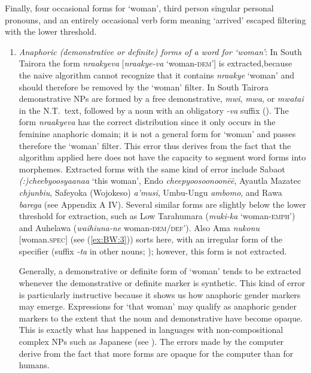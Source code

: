 \documentclass[output=collectionpaper]{langsci/langscibook}
\begin{document}
Finally, four occasional forms for ‘woman’, third person singular personal pronouns, and an entirely occasional verb form meaning ‘arrived’ escaped filtering with the lower threshold.

\begin{enumerate}[label=(\alph*)]
\item
\emph{Anaphoric (demonstrative or definite) forms of a word for ‘woman’}: In South Tairora the form \textit{nraakyeva} [\textit{nraakye-va} ‘woman-\textsc{dem}’] is extracted,\linebreak because the naive algorithm cannot recognize that it contains \textit{nraakye} ‘woman’ and should therefore be removed by the ‘woman’ filter. In South Tairora demonstrative NPs are formed by a free demonstrative, \textit{mwi}, \textit{mwa}, or \textit{mwatai} in the N.T.\ text, followed by a noun with an obligatory \textit{-va} suffix (\citealt[584]{Vincent2010}). The form \textit{nraakyeva} has the correct distribution since it only occurs in the feminine anaphoric domain; it is not a general form for ‘woman’ and passes therefore the ‘woman’ filter. This error thus derives from the fact that the algorithm applied here does not have the capacity to segment word forms into morphemes. Extracted forms with the same kind of error include Sabaot \textit{(:)cheebyoosyaanaa} ‘this woman’, Endo \textit{cheepyoosoonoonēē}, Ayautla Mazatec \textit{chjunbiu}, Safeyoka (Wojokeso) \textit{a'musi}, Umbu-Ungu \textit{ambomo}, and Rawa \textit{barega}
(see Appendix A IV). Several similar forms are slightly below the lower threshold for extraction, such as Low Tarahumara (\textit{muki-ka} ‘woman-\textsc{emph}') and Auhelawa (\textit{waihiuna-ne} woman-\textsc{dem/def}’). Also Ama \textit{nukonu} [woman.\textsc{spec}] (see (\ref{ex:BW:3})) sorts here, with an irregular form of the specifier (suffix \textit{-ta} in other nouns; \citealt[92]{Arsjoe1999}); however, this form is not extracted.

Generally, a demonstrative or definite form of ‘woman’ tends to be extracted whenever the demonstrative or definite marker is synthetic. This kind of error is particularly instructive because it shows us how anaphoric gender markers may emerge. Expressions for ‘that woman’ may qualify as anaphoric gender markers to the extent that the noun and demonstrative have become opaque. This is exactly what has happened in languages with non-compositional complex NPs such as Japanese (see  ). The errors made by the computer derive from the fact that more forms are opaque for the computer than for humans.


\end{enumerate}
\end{document}
